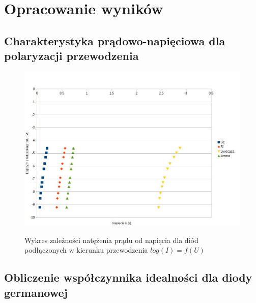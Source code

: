 \documentclass{article}
\begin{document}
\clearpage


\section{Opracowanie wyników}
\subsection{Charakterystyka prądowo-napięciowa dla polaryzacji przewodzenia}

\begin{figure}[h!]
	\centering
	\includegraphics[scale=0.3]{c01new}
	\label{fig:ch01new}
	\caption{Wykres zależności natężenia prądu od napięcia dla diód podłączonych w kierunku przewodzenia $log(I) = f(U)$}
\end{figure}

\subsection{Obliczenie współczynnika idealności dla diody germanowej}
\end{document}
